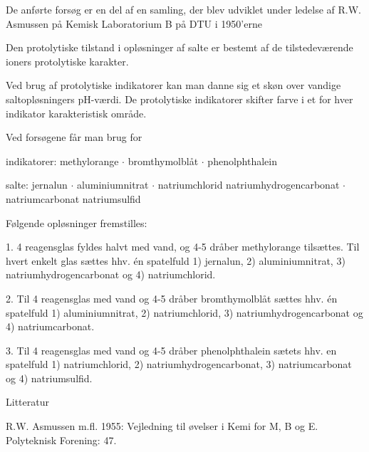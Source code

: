 %




De anførte forsøg er en del af en samling, der blev udviklet under ledelse af R.W. Asmussen på Kemisk Laboratorium B på DTU i 1950'erne

Den protolytiske tilstand i opløsninger af salte er bestemt af de tilstedeværende ioners protolytiske karakter.

Ved brug af protolytiske indikatorer kan man danne sig et skøn over vandige saltopløsningers pH-værdi. De protolytiske indikatorer skifter farve i et for hver indikator karakteristisk område.



Ved forsøgene får man brug for

indikatorer: methylorange $\cdotp$ bromthymolblåt $\cdotp$ phenolphthalein

salte: jernalun $\cdotp$ aluminiumnitrat $\cdotp$ natriumchlorid
       natriumhydrogencarbonat $\cdotp$ natriumcarbonat
                                natriumsulfid




Følgende opløsninger fremstilles:

1. 4 reagensglas fyldes halvt med vand, og 4-5 dråber methylorange tilsættes. Til hvert enkelt glas sættes hhv. én spatelfuld 1) jernalun, 2) aluminiumnitrat, 3) natriumhydrogencarbonat og 4) natriumchlorid.

2. Til 4 reagensglas med vand og 4-5 dråber bromthymolblåt sættes hhv. én spatelfuld 1) aluminiumnitrat, 2) natriumchlorid, 3) natriumhydrogencarbonat og 4) natriumcarbonat.

3. Til 4 reagensglas med vand og 4-5 dråber phenolphthalein sætets hhv. en spatelfuld 1) natriumchlorid, 2) natriumhydrogencarbonat, 3) natriumcarbonat og 4) natriumsulfid.



Litteratur

R.W. Asmussen m.fl. 1955: Vejledning til øvelser i Kemi for M, B og E. Polyteknisk Forening: 47.
